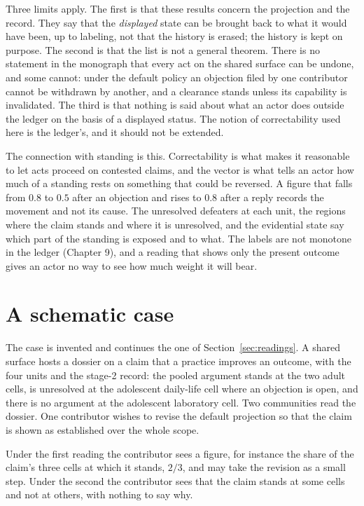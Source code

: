 \documentclass[11pt]{article}
\begin{document}
Three limits apply. The first is that these results concern the projection and the record. They say that the \emph{displayed} state can be brought back to what it would have been, up to labeling, not that the history is erased; the history is kept on purpose. The second is that the list is not a general theorem. There is no statement in the monograph that every act on the shared surface can be undone, and some cannot: under the default policy an objection filed by one contributor cannot be withdrawn by another, and a clearance stands unless its capability is invalidated. The third is that nothing is said about what an actor does outside the ledger on the basis of a displayed status. The notion of correctability used here is the ledger's, and it should not be extended.

The connection with standing is this. Correctability is what makes it reasonable to let acts proceed on contested claims, and the vector is what tells an actor how much of a standing rests on something that could be reversed. A figure that falls from $0.8$ to $0.5$ after an objection and rises to $0.8$ after a reply records the movement and not its cause. The unresolved defeaters at each unit, the regions where the claim stands and where it is unresolved, and the evidential state say which part of the standing is exposed and to what. The labels are not monotone in the ledger (Chapter 9), and a reading that shows only the present outcome gives an actor no way to see how much weight it will bear.

\section{A schematic case}\label{sec:case}

The case is invented and continues the one of Section~\ref{sec:readings}. A shared surface hosts a dossier on a claim that a practice improves an outcome, with the four units and the stage-2 record: the pooled argument stands at the two adult cells, is unresolved at the adolescent daily-life cell where an objection is open, and there is no argument at the adolescent laboratory cell. Two communities read the dossier. One contributor wishes to revise the default projection so that the claim is shown as established over the whole scope.

Under the first reading the contributor sees a figure, for instance the share of the claim's three cells at which it stands, $2/3$, and may take the revision as a small step. Under the second the contributor sees that the claim stands at some cells and not at others, with nothing to say why.
\end{document}
